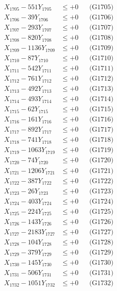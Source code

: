 \documentclass[a4paper,10pt]{article}
\begin{document}
{\begin{align}
X_{1705} - 551Y_{1705} &\leq +0 && \text{(G1705)} \\
X_{1706} - 39Y_{1706} &\leq +0 && \text{(G1706)} \\
X_{1707} - 293Y_{1707} &\leq +0 && \text{(G1707)} \\
X_{1708} - 820Y_{1708} &\leq +0 && \text{(G1708)} \\
X_{1709} - 1136Y_{1709} &\leq +0 && \text{(G1709)} \\
X_{1710} - 87Y_{1710} &\leq +0 && \text{(G1710)} \\
\allowbreak
X_{1711} - 542Y_{1711} &\leq +0 && \text{(G1711)} \\
X_{1712} - 761Y_{1712} &\leq +0 && \text{(G1712)} \\
X_{1713} - 492Y_{1713} &\leq +0 && \text{(G1713)} \\
X_{1714} - 493Y_{1714} &\leq +0 && \text{(G1714)} \\
X_{1715} - 62Y_{1715} &\leq +0 && \text{(G1715)} \\
X_{1716} - 161Y_{1716} &\leq +0 && \text{(G1716)} \\
X_{1717} - 892Y_{1717} &\leq +0 && \text{(G1717)} \\
X_{1718} - 741Y_{1718} &\leq +0 && \text{(G1718)} \\
X_{1719} - 1063Y_{1719} &\leq +0 && \text{(G1719)} \\
X_{1720} - 74Y_{1720} &\leq +0 && \text{(G1720)} \\
\allowbreak
X_{1721} - 1206Y_{1721} &\leq +0 && \text{(G1721)} \\
X_{1722} - 387Y_{1722} &\leq +0 && \text{(G1722)} \\
X_{1723} - 26Y_{1723} &\leq +0 && \text{(G1723)} \\
X_{1724} - 403Y_{1724} &\leq +0 && \text{(G1724)} \\
X_{1725} - 224Y_{1725} &\leq +0 && \text{(G1725)} \\
X_{1726} - 143Y_{1726} &\leq +0 && \text{(G1726)} \\
X_{1727} - 2183Y_{1727} &\leq +0 && \text{(G1727)} \\
X_{1728} - 104Y_{1728} &\leq +0 && \text{(G1728)} \\
X_{1729} - 379Y_{1729} &\leq +0 && \text{(G1729)} \\
X_{1730} - 145Y_{1730} &\leq +0 && \text{(G1730)} \\
\allowbreak
X_{1731} - 506Y_{1731} &\leq +0 && \text{(G1731)} \\
X_{1732} - 1051Y_{1732} &\leq +0 && \text{(G1732)} \\

\end{align}}
\end{document}
